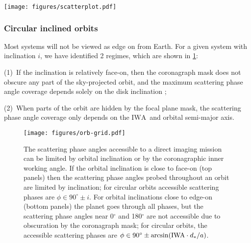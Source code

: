 \documentclass[
    usenatbib,
]{mnras}
\newcommand{\IWA}{\ensuremath{\mathrm{IWA}}}
\begin{document}
\begin{figure*}
    \centering
    \texttt{[image: figures/scatterplot.pdf]}
    \caption{
        Scatter plot for the target sample, showing stellar effective temperature and stellar distance. 
        The size of the points represents the angular separation of the star and planet in milliarcseconds as presented in the target list. 
        The colour of the points shows $\Delta \varphi$ assuming a circular edge-on orbit at a semi-major axis corresponding to an Earth-like instellation for an IWA of 62 mas. Additionally, the colour bar indicates the atmospheric phenomenon that can be detected where phenomena from the bottom of the colour bar up to the indicated colour are detectable for that system.
        Thus, dark blue points are systems which have the most key features, as systems in which the angles required to see the rainbow are probed will also have the angles required to see the Rayleigh scattering probed.
    }
    \label{fig:scatterplot}
\end{figure*}


\subsubsection{Circular inclined orbits}

Most systems will not be viewed as edge on from Earth.
%
For a given system with inclination $i$, we have identified 2 regimes, which are shown in \cref{fig:orb-grid}:

(1)~If the inclination is relatively face-on, then the coronagraph mask does not obscure any part of the sky-projected orbit, and the maximum scattering phase angle coverage depends solely on the disk inclination ;

(2)~When parts of the orbit  are hidden by the focal plane mask, the scattering phase angle coverage only depends on the \IWA\ and orbital semi-major axis. 

\begin{figure}%
   \centering
   \texttt{[image: figures/orb-grid.pdf]}
   \caption{
        The scattering phase angles accessible to a direct imaging mission can be limited by orbital inclination or by the coronagraphic inner working angle. 
        If the orbital inclination is close to face-on (top panels) then the scattering phase angles probed throughout an orbit are limited by inclination; for circular orbits accessible scattering phases are $\phi \in 90^\circ \pm i$. 
        For orbital inclinations close to edge-on (bottom panels) the planet goes through all phases, but the scattering phase angles near 0$^\circ$ and 180$^\circ$ are not accessible due to obscuration by the coronagraph mask; for circular orbits, the accessible scattering phases are $\phi \in 90^\circ \pm \arcsin({\rm IWA}\cdot d_*/a)$.
    }
    \label{fig:orb-grid}
\end{figure}
\end{document}
